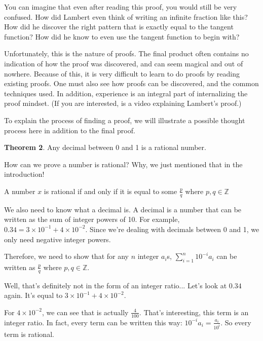 \documentclass[11pt]{article}
\begin{document}
    You can imagine that even after reading this proof, you would still be very confused.
    How did Lambert even think of writing an infinite fraction like this? How did he
    discover the right pattern that is exactly equal to the tangent function? How did
    he know to even use the tangent function to begin with?
    
    Unfortunately, this is the nature of proofs. The final product often contains no
    indication of how the proof was discovered, and can seem magical and out of nowhere.
    Because of this, it is very difficult to learn to do proofs by reading existing proofs.
    One must also see how proofs can be discovered, and the common techniques used.
    In addition, experience is an integral part of internalizing the proof mindset.
    (If you are interested, \href{https://youtu.be/Lk_QF_hcM8A}{\color{blue}{here}} is a video explaining Lambert's proof.)
    

    To explain the process of finding a proof, we will illustrate a possible thought
    process here in addition to the final proof.
    
    \textbf{Theorem 2}. Any decimal between 0 and 1 is a rational number.
    
    How can we prove a number is rational? Why, we just mentioned that in the introduction!
    
    A number $x$ is rational if and only if it is equal to some $\frac pq$ where $p,q\in\mathbb Z$
    
    We also need to know what a decimal is. A decimal is a number that can be written as
    the sum of integer powers of 10. For example, $0.34=3\times10^{-1}+4\times10^{-2}$.
    Since we're dealing with decimals between 0 and 1, we only need negative integer powers.
    
    Therefore, we need to show that for any $n$ integer $a_i$s,
    $\displaystyle\sum_{i=1}^{n}10^{-i}a_i$ can be written as $\frac pq$ where
    $p,q\in\mathbb Z$.
    
    Well, that's definitely not in the form of an integer ratio... Let's look at $0.34$ again. It's equal to $3\times10^{-1}+4\times10^{-2}$.
    
    For $4\times10^{-2}$, we can see that is actually $\frac4{100}$. That's
    interesting, this term is an integer ratio. In fact, every term can be written this way:
    $10^{-i}a_i=\frac{a_i}{10^i}$. So every term is rational.
    
\end{document}

